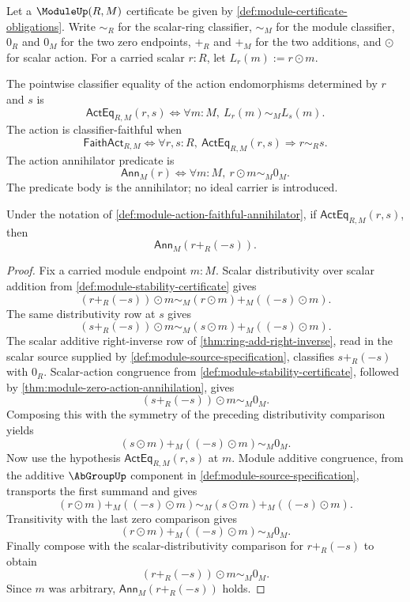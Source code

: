 \begin{definition}
\label{def:module-action-faithful-annihilator}
Let a $\ModuleUp(R,M)$ certificate be given by \autoref{def:module-certificate-obligations}. Write $\sim_R$ for the scalar-ring classifier, $\sim_M$ for the module classifier, $0_R$ and $0_M$ for the two zero endpoints, $+_R$ and $+_M$ for the two additions, and $\odot$ for scalar action. For a carried scalar $r:R$, let $L_r(m):=r\odot m$.

The pointwise classifier equality of the action endomorphisms determined by $r$ and $s$ is
$$
\mathsf{ActEq}_{R,M}(r,s)\Longleftrightarrow
\forall m:M,\ L_r(m)\sim_M L_s(m).
$$
The action is classifier-faithful when
$$
\mathsf{FaithAct}_{R,M}\Longleftrightarrow
\forall r,s:R,\ \mathsf{ActEq}_{R,M}(r,s)\Longrightarrow r\sim_R s.
$$
The action annihilator predicate is
$$
\mathsf{Ann}_M(r)\Longleftrightarrow
\forall m:M,\ r\odot m\sim_M 0_M.
$$
The predicate body is the annihilator; no ideal carrier is introduced.
\end{definition}

\begin{lemma}
\label{lem:module-pointwise-action-equality-difference-annihilator}
Under the notation of \autoref{def:module-action-faithful-annihilator}, if
$\mathsf{ActEq}_{R,M}(r,s)$, then
$$
\mathsf{Ann}_M(r+_R(-s)).
$$
\end{lemma}
\begin{proof}
Fix a carried module endpoint $m:M$. Scalar distributivity over scalar addition from \autoref{def:module-stability-certificate} gives
$$
(r+_R(-s))\odot m\sim_M (r\odot m)+_M((-s)\odot m).
$$
The same distributivity row at $s$ gives
$$
(s+_R(-s))\odot m\sim_M (s\odot m)+_M((-s)\odot m).
$$
The scalar additive right-inverse row of \autoref{thm:ring-add-right-inverse}, read in the scalar source supplied by \autoref{def:module-source-specification}, classifies $s+_R(-s)$ with $0_R$. Scalar-action congruence from \autoref{def:module-stability-certificate}, followed by \autoref{thm:module-zero-action-annihilation}, gives
$$
(s+_R(-s))\odot m\sim_M 0_M.
$$
Composing this with the symmetry of the preceding distributivity comparison yields
$$
(s\odot m)+_M((-s)\odot m)\sim_M 0_M.
$$
Now use the hypothesis $\mathsf{ActEq}_{R,M}(r,s)$ at $m$. Module additive congruence, from the additive $\AbGroupUp$ component in \autoref{def:module-source-specification}, transports the first summand and gives
$$
(r\odot m)+_M((-s)\odot m)\sim_M (s\odot m)+_M((-s)\odot m).
$$
Transitivity with the last zero comparison gives
$$
(r\odot m)+_M((-s)\odot m)\sim_M 0_M.
$$
Finally compose with the scalar-distributivity comparison for $r+_R(-s)$ to obtain
$$
(r+_R(-s))\odot m\sim_M 0_M.
$$
Since $m$ was arbitrary, $\mathsf{Ann}_M(r+_R(-s))$ holds.
\end{proof}

